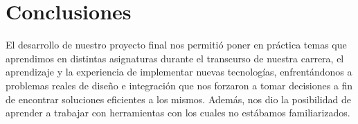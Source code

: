 
\chapter{Conclusiones}

El desarrollo de nuestro proyecto final nos permitió poner en práctica temas que aprendimos en distintas asignaturas durante el transcurso de nuestra carrera, el aprendizaje y la experiencia de implementar nuevas tecnologías, enfrentándonos a problemas reales de diseño e integración que nos forzaron a tomar decisiones a fin de encontrar soluciones eficientes a los mismos. Además, nos dio la posibilidad de aprender a trabajar con herramientas con los cuales no estábamos familiarizados.

